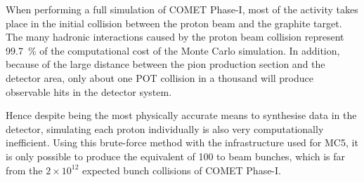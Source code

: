 When performing a full simulation of COMET Phase-I, most of the activity takes
place in the initial collision between the proton beam and the graphite target.
The many hadronic interactions caused by the proton beam collision
represent \SI{99.7}{\percent} of the computational cost of the Monte Carlo
simulation.
In addition, because of the large distance between the pion production section
and the detector area, only about one POT collision in a thousand will produce
observable hits in the detector system. 

Hence despite being the most physically
accurate means to synthesise data in the detector, simulating each proton
individually is also very computationally inefficient. Using this brute-force
method with the infrastructure used for MC5, it is only possible to produce the
equivalent of 100 to  beam bunches, which is far from the $2\times 10^{12}$
expected bunch collisions of COMET Phase-I.




